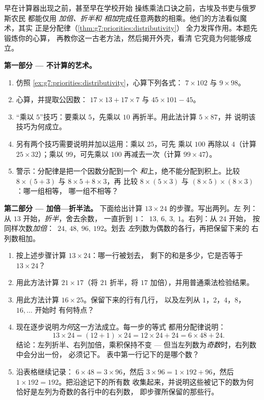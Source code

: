 \begin{problem}
\label{pb:g7:priorities:1}
早在计算器出现之前，甚至早在学校开始
操练乘法口诀之前，古埃及书吏与俄罗斯农民
都能仅用 \emph{加倍、折半和
相加}完成任意两数的相乘。他们的方法看似魔术，其实
正是分配律（\cref{thm:g7:priorities:distributivity}）
全力发挥作用。本题先锻炼你的心算，
再教你这一古老方法，然后揭开外壳，看清
它究竟为何能够成立。

\medskip
\noindent\textbf{第一部分 --- 不计算的艺术。}
\begin{enumerate}
  \item 仿照
        \cref{ex:g7:priorities:distributivity}，心算下列各式：
        $7 \times 102$ 与 $9 \times 98$。
  \item 心算，并提取公因数：
        $17 \times 13 + 17 \times 7$ 与
        $45 \times 101 - 45$。
  \item “乘以 $5$”技巧：要乘以 $5$，先乘以
        $10$ 再折半。用此法计算 $5 \times 87$，并
        说明该技巧为何成立。
  \item 另有两个技巧需要说明并加以运用：乘以 $25$，可先
        乘以 $100$ 再除以 $4$（计算
        $25 \times 32$）；乘以 $99$，可先乘以 $100$
        再减去一次（计算 $99 \times 47$）。
  \item 警示：分配律是把一个因数分配到一个
        \emph{和}上，绝不能分配到积上。比较
        $8 \times (5 + 3)$ 与 $8 \times 5 + 8 \times 3$，再
        比较 $8 \times (5 \times 3)$ 与
        $(8 \times 5) \times (8 \times 3)$：哪一组相等，
        哪一组不相等？
\end{enumerate}

\medskip
\noindent\textbf{第二部分 --- 加倍—折半法。}
下面给出计算 $13 \times 24$ 的步骤。写出两列。左
列：从 $13$ 开始，\emph{折半}，舍去余数，
一直折到 $1$：\ $13,\ 6,\ 3,\ 1$。右列：从 $24$ 开始，
按同样次数\emph{加倍}：\ $24,\ 48,\ 96,\ 192$。划去
\emph{左}列数为偶数的各行，再把保留下来的
右列数相加。
\begin{enumerate}[resume]
  \item 按上述步骤计算 $13 \times 24$：哪一行被划去，
        剩下的和是多少，它是否等于
        $13 \times 24$？
  \item 用此方法计算 $21 \times 17$（将 $21$ 折半，将
        $17$ 加倍），并用普通乘法检验结果。
  \item 用此方法计算 $16 \times 25$。保留下来的行有几行，
        以及左列从 $1$，$2$，$4$，$8$，$16, \dots$ 开始时
        有何特点？
  \item 现在逐步说明\emph{为何}这一方法成立。每一步的等式
        都用分配律说明：
        \[
        13 \times 24 = (12 + 1) \times 24
        = 12 \times 24 + 24 = 6 \times 48 + 24 .
        \]
        结论：左列折半、右列加倍，乘积保持不变 ---
        但当左列数为\emph{奇数}时，右列数中会分出一份，
        必须记下。
        表中第一行记下的是哪个数？
  \item 沿表格继续记录：
        $6 \times 48 = 3 \times 96$，然后
        $3 \times 96 = 1 \times 192 + 96$，然后
        $1 \times 192 = 192$。把沿途记下的所有数
        收集起来，并说明这些被记下的数为何
        恰好是左列为奇数的各行中的右列数，
        即步骤所保留的那些行。
\end{enumerate}


\end{problem}
